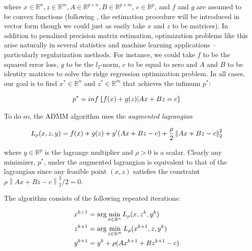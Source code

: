 \documentclass[11pt,]{report}
\begin{document}
where \(x \in \mathbb{R}^{n}, z \in \mathbb{R}^{m}, A \in \mathbb{R}^{p \times n}, B \in \mathbb{R}^{p \times m}\), \(c \in \mathbb{R}^{p}\), and \(f\) and \(g\) are assumed to be convex functions (following \citet{boyd2011distributed}, the estimation procedure will be introduced in vector form though we could just as easily take \(x\) and \(z\) to be matrices). In addition to penalized precision matrix estimation, optimization problems like this arise naturally in several statistics and machine learning applications -- particularly regularization methods. For instance, we could take \(f\) to be the squared error loss, \(g\) to be the \(l_{2}\)-norm, \(c\) to be equal to zero and \(A\) and \(B\) to be identity matrices to solve the ridge regression optimization problem. In all cases, our goal is to find \(x^{*} \in \mathbb{R}^{n}\) and \(z^{*} \in \mathbb{R}^{m}\) that achieves the infimum \(p^{*}\):

\begin{equation}
p^{*} = inf\left\{ f(x) + g(z) | Ax + Bz = c \right\}
\label{eq:infimum}\notag
\end{equation}

To do so, the ADMM algorithm uses the \emph{augmented lagrangian}

\begin{equation}
L_{\rho}(x, z, y) = f(x) + g(z) + y'(Ax + Bz - c) + \frac{\rho}{2}\left\| Ax + Bz - c \right\|_{2}^{2}
\label{eq:auglagrange}\notag
\end{equation}

where \(y \in \mathbb{R}^{p}\) is the lagrange multiplier and \(\rho > 0\) is a scalar. Clearly any minimizer, \(p^{*}\), under the augmented lagrangian is equivalent to that of the lagrangian since any feasible point \((x, z)\) satisfies the constraint \(\rho\left\| Ax + Bz - c \right\|_{2}^{2}/2 = 0\).

The algorithm consists of the following repeated iterations:

\begin{equation}
\begin{split}
  x^{k + 1} &= \arg\min_{x \in \mathbb{R}^{n}}L_{\rho}(x, z^{k}, y^{k}) \\
  z^{k + 1} &= \arg\min_{z \in \mathbb{R}^{m}}L_{\rho}(x^{k + 1}, z, y^{k}) \\
  y^{k + 1} &= y^{k} + \rho(Ax^{k + 1} + Bz^{k + 1} - c)
\end{split}  
\label{eq:admmalgo}\notag
\end{equation}
\end{document}
